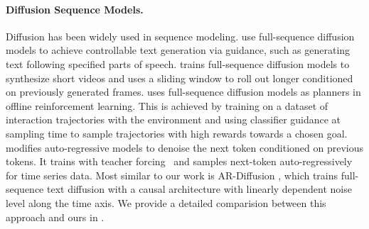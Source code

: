 \paragraph{Diffusion Sequence Models.}
Diffusion has been widely used in sequence modeling. \cite{li2022diffusionlm} use full-sequence diffusion models to achieve controllable text generation via guidance, such as generating text following specified parts of speech.  \cite{ho2022video} trains full-sequence diffusion models to synthesize short videos and uses a sliding window to roll out longer conditioned on previously generated frames. \cite{janner2022planning} uses full-sequence diffusion models as planners in offline reinforcement learning. This is achieved by training on a dataset of interaction trajectories with the environment and using classifier guidance at sampling time to sample trajectories with high rewards towards a chosen goal. \cite{rasul2021autoregressive} modifies auto-regressive models to denoise the next token conditioned on previous tokens. It trains with teacher forcing~\cite{teacher_forcing} and samples next-token auto-regressively for time series data. Most similar to our work is AR-Diffusion \cite{wu2023ardiffusion}, which trains full-sequence text diffusion with a causal architecture with linearly dependent noise level along the time axis. We provide a detailed comparision between this approach and ours  in .

